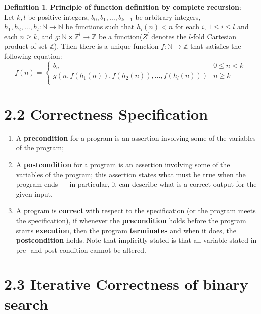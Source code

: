 \documentclass[11pt]{article}
\theoremstyle{plain}%
\theoremstyle{definition}
\newtheorem{defn}{Definition}
\theoremstyle{remark}
\newcommand{\N}{\mathbb{N}}
\begin{document}
\begin{defn}
  \label{Principle of function definition by complete recursion}
  \textbf{Principle of function definition by complete recursion}: \\
  Let $k, l$ be positive integers, $b_0,b_1,\dots,b_{k-1}$ be arbitrary integers, $h_1,h_2,\dots,h_l : \N \to \N$ be functions such that $h_i(n) < n$ for each $i$, $1\leq i\leq l $ and each $n \geq k$, and $g:\N\times \mathbb{Z}^l \to \mathbb{Z}$ be a function($Z^l$ denotes the $l$-fold Cartesian product of set $\mathbb{Z}$). Then there is a unique function $f : \N \to \mathbb{Z}$ that satisfies the following equation:
  \[
  f(n)=
  \begin{cases}
    b_n & 0 \leq n < k\\
    g(n, f(h_1(n)), f(h_2(n)), \dots, f(h_l(n))) & n \geq k\\
  \end{cases}
    \]
\end{defn}


\section*{2.2 Correctness Specification}

\begin{enumerate}
  \item A \textbf{precondition} for a program is an assertion involving some of the variables of the program;
  \item A \textbf{postcondition} for a program is an assertion involving some of the variables of the program; this assertion states what must be true when the program ends — in particular, it can describe what is a correct output for the given input.
  \item A program is \textbf{correct} with respect to the specification (or the program meets the specification), if whenever the \textbf{precondition} holds before the program starts \textbf{execution}, then the program \textbf{terminates} and when it does, the \textbf{postcondition} holds. Note that implicitly stated is that all variable stated in pre- and post-condition cannot be altered.
\end{enumerate}

\section*{2.3 Iterative Correctness of binary search}
\end{document}
